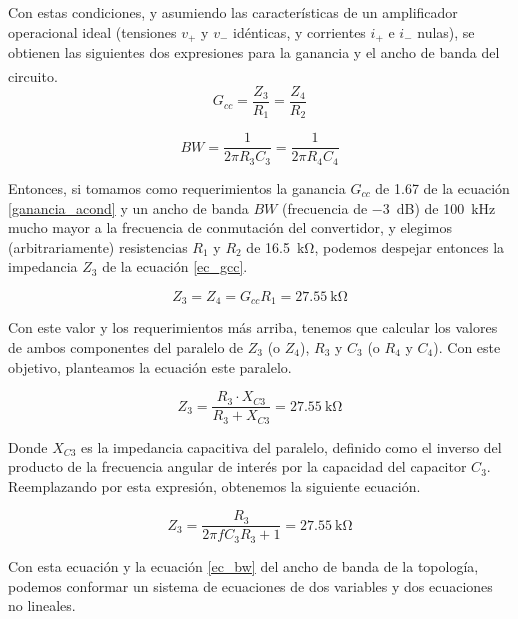 Con estas condiciones, y asumiendo las características de un amplificador operacional ideal (tensiones $v_+$ y $v_-$ idénticas, y corrientes $i_+$ e $i_-$ nulas), se obtienen las siguientes dos expresiones para la ganancia y el ancho de banda del circuito.\textsuperscript{\cite{Caravelli-Irusta}\cite{DifferenceAmps}}\\

\begin{equation}\label{ec_gcc}
    G_{cc} = \frac{Z_3}{R_1} = \frac{Z_4}{R_2}
\end{equation}

\begin{equation}\label{ec_bw}
    BW = \frac{1}{2\pi R_3C_3} = \frac{1}{2\pi R_4C_4}
\end{equation}

Entonces, si tomamos como requerimientos la ganancia $G_{cc}$ de \num{1.67} de la ecuación \ref{ganancia_acond} y un ancho de banda $BW$ (frecuencia de \SI[]{-3}[]{\deci\bel}) de \SI[]{100}[]{\kilo\hertz} mucho mayor a la frecuencia de conmutación del convertidor, y elegimos (arbitrariamente) resistencias $R_1$ y $R_2$ de \SI[]{16.5}[]{\kilo\ohm}, podemos despejar entonces la impedancia $Z_3$ de la ecuación \ref{ec_gcc}.

\begin{equation}
    Z_3 = Z_4 = G_{cc}R_1 = \SI{27.55}{\kilo\ohm}
\end{equation}

Con este valor y los requerimientos más arriba, tenemos que calcular los valores de ambos componentes del paralelo de $Z_3$ (o $Z_4$), $R_3$ y $C_3$ (o $R_4$ y $C_4$). Con este objetivo, planteamos la ecuación este paralelo.

\begin{equation}
    Z_3 = \frac{R_3\cdot X_{C3}}{R_3+X_{C3}} = \SI{27.55}{\kilo\ohm}
\end{equation}

Donde $X_{C3}$ es la impedancia capacitiva del paralelo, definido como el inverso del producto de la frecuencia angular de interés por la capacidad del capacitor $C_3$. Reemplazando por esta expresión, obtenemos la siguiente ecuación.

\begin{equation}\label{eq_z3}
        Z_3 = \frac{R_3}{2\pi fC_3R_3 + 1} = \SI[]{27.55}[]{\kilo\ohm}
\end{equation}

Con esta ecuación y la ecuación \ref{ec_bw} del ancho de banda de la topología, podemos conformar un sistema de ecuaciones de dos variables y dos ecuaciones no lineales.

